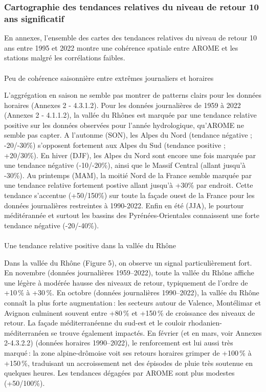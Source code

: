 \documentclass[
  article,
  nofooter,
  noheadings]{jss}
\makeatletter
\let\oldparagraph\paragraph
\renewcommand{\paragraph}{
    \@ifstar
      \xxxParagraphStar
      \xxxParagraphNoStar
  }
\newcommand{\xxxParagraphStar}[1]{\oldparagraph*{#1}\mbox{}}
\newcommand{\xxxParagraphNoStar}[1]{\oldparagraph{#1}\mbox{}}
\makeatother
\begin{document}
\subsubsection{Cartographie des tendances relatives du niveau de retour
10 ans
significatif}\label{cartographie-des-tendances-relatives-du-niveau-de-retour-10-ans-significatif}

En annexes, l'ensemble des cartes des tendances relatives du niveau de
retour 10 ans entre 1995 et 2022 montre une cohérence spatiale entre
AROME et les stations malgré les corrélations faibles.

\paragraph{Peu de cohérence saisonnière entre extrêmes journaliers et
horaires}\label{peu-de-cohuxe9rence-saisonniuxe8re-entre-extruxeames-journaliers-et-horaires}

L'aggrégation en saison ne semble pas montrer de patterns clairs pour
les données horaires (Annexes 2 - 4.3.1.2). Pour les données
journalières de 1959 à 2022 (Annexes 2 - 4.1.1.2), la vallée du Rhônes
est marquée par une tendance relative positive sur les données observées
pour l'année hydrologique, qu'AROME ne semble pas capter. A l'autonme
(SON), les Alpes du Nord (tendance négative ; -20/-30\%) s'opposent
fortement aux Alpes du Sud (tendance positive ; +20/30\%). En hiver
(DJF), les Alpes du Nord sont encore une fois marquée par une tendance
négative (-10/-20\%), ainsi que le Massif Central (allant jusqu'à
-30\%). Au printemps (MAM), la moitié Nord de la France semble marquée
par une tendance relative fortement postive allant jusqu'à +30\% par
endroit. Cette tendance s'accentue (+50/150\%) sur toute la façade ouest
de la France pour les données journalières restreintes à 1990-2022.
Enfin en été (JJA), le pourtour méditérannée et surtout les bassins des
Pyrénées-Orientales connaissent une forte tendance négative (-20/-40\%).

\paragraph{Une tendance relative positive dans la vallée du
Rhône}\label{une-tendance-relative-positive-dans-la-valluxe9e-du-rhuxf4ne}

Dans la vallée du Rhône (Figure 5), on observe un signal
particulièrement fort. En novembre (données journalières 1959--2022),
toute la vallée du Rhône affiche une légère à modérée hausse des niveaux
de retour, typiquement de l'ordre de +10\,\% à +30\,\%. En octobre
(données journalières 1990--2022), la vallée du Rhône connaît la plus
forte augmentation\,: les secteurs autour de Valence, Montélimar et
Avignon culminent souvent entre +80\,\% et +150\,\% de croissance des
niveaux de retour. La façade méditerranéenne du sud-est et le couloir
rhodanien-méditerranéen se trouve également impactés. En février (et en
mars, voir Annexes 2-4.3.2.2) (données horaires 1990--2022), le
renforcement est lui aussi très marqué\,: la zone alpine-drômoise voit
ses retours horaires grimper de +100\,\% à +150\,\%, traduisant un
accroissement net des épisodes de pluie très soutenue en quelques
heures. Les tendances dégagées par AROME sont plus modestes (+50/100\%).
\end{document}
